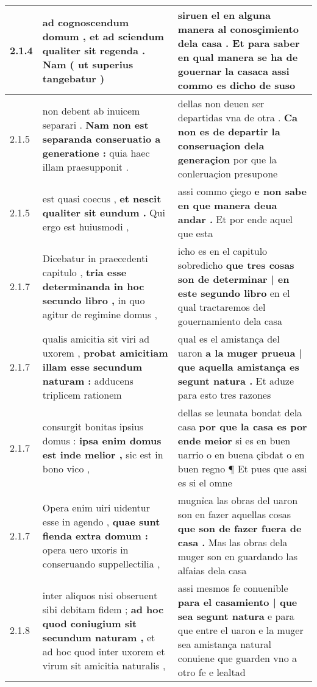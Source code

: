 \begin{tabular}{|p{1cm}|p{6.5cm}|p{6.5cm}|}
2.1.4 & ad cognoscendum domum , \textbf{ et ad sciendum qualiter sit regenda . } Nam ( ut superius tangebatur ) & siruen el en alguna manera al conosçimiento dela casa . \textbf{ Et para saber en qual manera se ha de gouernar la } casaca assi commo es dicho de suso \\\hline
2.1.5 & non debent ab inuicem separari . \textbf{ Nam non est separanda conseruatio a generatione : } quia haec illam praesupponit . & dellas non deuen ser departidas vna de otra . \textbf{ Ca non es de departir la conseruaçion dela generaçion } por que la conleruaçion presupone \\\hline
2.1.5 & est quasi coecus , \textbf{ et nescit qualiter sit eundum . } Qui ergo est huiusmodi , & assi commo çiego \textbf{ e non sabe en que manera deua andar . } Et por ende aquel que esta \\\hline
2.1.7 & Dicebatur in praecedenti capitulo , \textbf{ tria esse determinanda in hoc secundo libro , } in quo agitur de regimine domus , & icho es en el capitulo sobredicho \textbf{ que tres cosas son de determinar | en este segundo libro } en el qual tractaremos del gouernamiento dela casa \\\hline
2.1.7 & qualis amicitia sit viri ad uxorem , \textbf{ probat amicitiam illam esse secundum naturam : } adducens triplicem rationem & qual es el amistança del uaron \textbf{ a la muger prueua | que aquella amistança es segunt natura . } Et aduze para esto tres razones \\\hline
2.1.7 & consurgit bonitas ipsius domus : \textbf{ ipsa enim domus est inde melior , } sic est in bono vico , & dellas se leunata bondat dela casa \textbf{ por que la casa es por ende meior } si es en buen uarrio o en buena çibdat o en buen regno ¶ Et pues que assi es si el omne \\\hline
2.1.7 & Opera enim uiri uidentur esse in agendo , \textbf{ quae sunt fienda extra domum : } opera uero uxoris in conseruando suppellectilia , & mugnỉca las obras del uaron son en fazer aquellas cosas \textbf{ que son de fazer fuera de casa . } Mas las obras dela muger son en guardando las alfaias dela casa \\\hline
2.1.8 & inter aliquos nisi obseruent sibi debitam fidem ; \textbf{ ad hoc quod coniugium sit secundum naturam , } et ad hoc quod inter uxorem et virum sit amicitia naturalis , & assi mesmos fe conuenible \textbf{ para el casamiento | que sea segunt natura } e para que entre el uaron e la muger sea amistança natural conuiene que guarden vno a otro fe e lealtad \\\hline

\end{tabular}
